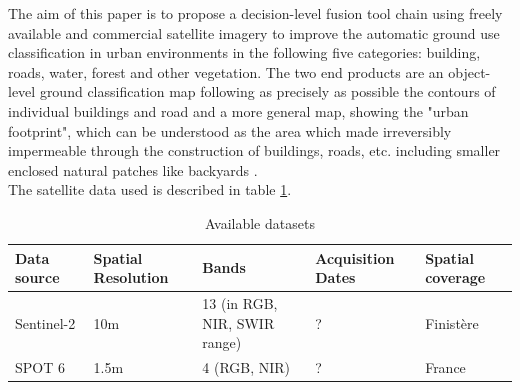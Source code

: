 \documentclass[10pt]{article}
\begin{document}
The aim of this paper is to propose a decision-level fusion tool chain using freely available and commercial satellite imagery to improve the automatic ground use classification in urban environments in the following five categories: building, roads, water, forest and other vegetation. The two end products are an object-level ground classification map following as precisely as possible the contours of individual buildings and road and a more general map, showing the "urban footprint", which can be understood as the area which made irreversibly impermeable through the construction of buildings, roads, etc. including smaller enclosed natural patches like backyards \parencite{puissant_object-oriented_2014}.\\

The satellite data used is described in table \ref{table:data}.
\begin{table}[H]
    \centering
    \begin{tabular}{p{2cm}p{1.8cm}p{3cm}p{2cm}p{1.5cm}}
        Data source & Spatial Resolution & Bands & Acquisition Dates & Spatial coverage\\\hline\hline
        Sentinel-2 & 10m & 13 (in RGB, NIR, SWIR range) &? & Finistère\\\hline
        SPOT 6 & 1.5m & 4 (RGB, NIR) & ? & France
    \end{tabular}
    \caption{Available datasets}
    \label{table:data}
\end{table}
\end{document}
